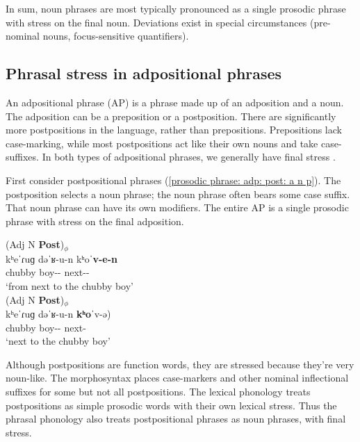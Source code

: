 In sum, noun phrases are most typically pronounced as a single prosodic phrase with stress on the final noun. Deviations exist in special circumstances (pre-nominal nouns, focus-sensitive quantifiers). 


\subsection{Phrasal stress in adpositional phrases}\label{section:intonation:phrase:adpos}
An adpositional phrase (AP) is a phrase made up of an adposition and a noun. The adposition can be a preposition or a postposition. There are significantly more postpositions in the language, rather than prepositions. Prepositions lack case-marking, while most postpositions act like their own nouns and take case-suffixes.  In both types of adpositional phrases, we generally have final stress  \citep[26-7]{Abeghyan-1933-Meter}. 


First consider postpositional phrases (\ref{prosodic phrase: adp: post: a n p}). The postposition selects a noun phrase; the noun phrase often bears some case suffix. That noun phrase can have its own modifiers. The entire AP is a single prosodic phrase with stress on the final adposition. 

\begin{exe}
	\ex \label{prosodic phrase: adp: post: a n p}\begin{xlist}
		\ex \glll (Adj N \textbf{Post})$_\phi$ \\
		kʰeˈɾuɡ dəˈʁ-u-n kʰoˈ\textbf{v-e-n} \\
		chubby boy-{\gen}-{} next-{\abl}-{} \\ 
		\trans `from next to the chubby boy' \label{prosodic phrase: adp: post: a n p: final} 
		\\ 
		\ex \glll (Adj N \textbf{Post})$_\phi$ \\
		kʰeˈɾuɡ dəˈʁ-u-n \textbf{kʰo}ˈv-ə) \\
		chubby boy-{\gen}-{} next-{} \\ 
		\trans `next to the chubby boy' \label{prosodic phrase: adp: post: a n p: final schwa} 
		\\ 
	\end{xlist}
\end{exe}

Although postpositions are function words, they are stressed because they're very noun-like. The morphosyntax places case-markers and other nominal inflectional suffixes for some but not all postpositions. The lexical phonology treats postpositions as simple prosodic words with their own  lexical stress. Thus the phrasal phonology also treats postpositional phrases as noun phrases, with final stress. 



